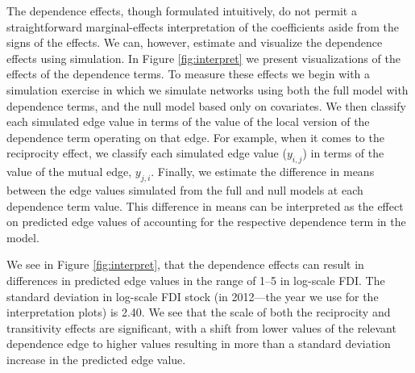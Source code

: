 \documentclass[reqno,onecolumn,letterpaper,12pt]{article}
\begin{document}
The dependence effects, though formulated intuitively, do not permit a straightforward marginal-effects interpretation of the coefficients aside from the signs of the effects. We can, however, estimate and visualize the dependence effects using simulation. In Figure \ref{fig:interpret} we present visualizations of the effects of the dependence terms. To measure these effects we begin with a simulation exercise in which we simulate networks using both the full model with dependence terms, and the null model based only on covariates. We then classify each simulated edge value in terms of the value of the local version of the dependence term operating on that edge. For example, when it comes to the reciprocity effect, we classify each simulated edge value ($y_{i,j}$) in terms of the value of the mutual edge, $y_{j,i}$. Finally, we estimate the difference in means between the edge values simulated from the full and null models at each dependence term value. This difference in means can be interpreted as the effect on predicted edge values of accounting for the respective dependence term in the model.


We see in Figure \ref{fig:interpret}, that the dependence effects can result in differences in predicted edge values in the range of 1--5 in log-scale FDI. The standard deviation in log-scale FDI stock (in 2012---the year we use for the interpretation plots) is 2.40.  We see that the scale of both the reciprocity and transitivity effects are significant, with a shift from lower values of the relevant dependence edge to higher values resulting in more than a standard deviation increase in the predicted edge value.
\end{document}
